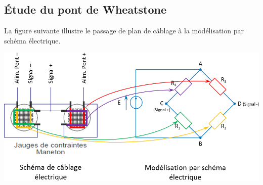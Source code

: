 \documentclass[10pt]{article}
\begin{document}
\subsection*{Étude du pont de Wheatstone}

La figure suivante illustre le passage de plan de câblage à la modélisation par schéma électrique. 

\begin{center}
\includegraphics[width=.75\textwidth]{images/cablage}
\end{center}
\end{document}
